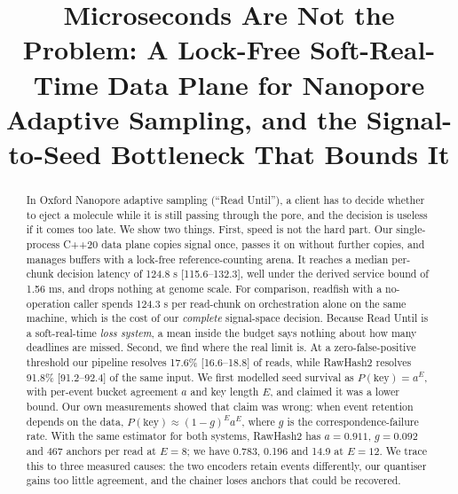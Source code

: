 \documentclass[conference]{IEEEtran}
\begin{document}
\title{Microseconds Are Not the Problem: A Lock-Free Soft-Real-Time Data Plane for Nanopore
Adaptive Sampling, and the Signal-to-Seed Bottleneck That Bounds It}

\author{
}

\maketitle

\begin{abstract}
In Oxford Nanopore adaptive sampling (``Read Until''), a client has to decide whether to eject
a molecule while it is still passing through the pore, and the decision is useless if it comes
too late. We show two things. First, speed is not the hard part. Our single-process C++20 data
plane copies signal once, passes it on without further copies, and manages buffers with a
lock-free reference-counting arena. It reaches a median per-chunk decision latency of
124.8 \textmu{}s [115.6--132.3], well under the derived service bound of 1.56 ms, and drops
nothing at genome scale. For comparison, readfish with a no-operation caller spends
124.3 \textmu{}s per read-chunk on orchestration alone on the same machine, which is the cost of
our \emph{complete} signal-space decision. Because Read Until is a soft-real-time \emph{loss
system}, a mean inside the budget says nothing about how many deadlines are missed. Second, we
find where the real limit is. At a zero-false-positive threshold our pipeline resolves
17.6\% [16.6--18.8] of reads, while RawHash2 resolves 91.8\% [91.2--92.4] of the same input. We
first modelled seed survival as $P(\mathrm{key}) = a^{E}$, with per-event bucket agreement $a$
and key length $E$, and claimed it was a lower bound. Our own measurements showed that claim
was wrong: when event retention depends on the data, $P(\mathrm{key}) \approx (1-g)^{E} a^{E}$,
where $g$ is the correspondence-failure rate. With the same estimator for both systems,
RawHash2 has $a = 0.911$, $g = 0.092$ and 467 anchors per read at $E = 8$; we have 0.783, 0.196
and 14.9 at $E = 12$. We trace this to three measured causes: the two encoders retain events
differently, our quantiser gains too little agreement, and the chainer loses anchors that could
be recovered.
\end{abstract}
\end{document}

